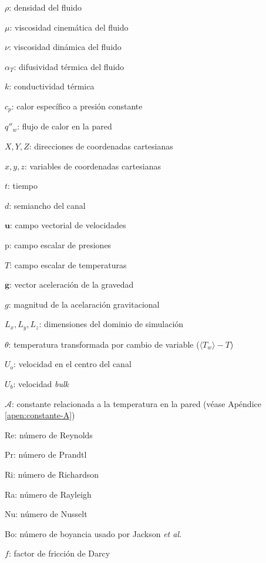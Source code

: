 \documentclass[12pt,screen,twoside]{ibtesis}
\begin{document}
\begin{preliminary}
\begin{abreviaturas}
\begin{itemize}
{{\item[] $\rho$: densidad del fluido 
\item[] $\mu$: viscosidad cinemática del fluido 
\item[] $\nu$: viscosidad dinámica del fluido
\item[] $\alpha_{T}$: difusividad térmica del fluido 
\item[] $k$: conductividad térmica 
\item[] $c_p$: calor específico a presión constante 
\item[] $q''_w$: flujo de calor en la pared 
\item[] $X,Y,Z$: direcciones de coordenadas cartesianas 
\item[] $x,y,z$: variables de coordenadas cartesianas 
\item[] $t$: tiempo 
\item[] $d$: semiancho del canal 
\item[] $\mathbf{u}$: campo vectorial de velocidades 
\item[] $\text{p}$: campo escalar de presiones 
\item[] $T$: campo escalar de temperaturas 
\item[] $\mathbf{g}$: vector aceleración de la gravedad
\item[] $g$: magnitud de la acelaración gravitacional 
\item[] $L_x,L_y,L_z$: dimensiones del dominio de simulación 
\item[] $\theta$: temperatura transformada por cambio de variable ($\langle T_w \rangle - T$)

\item[] $U_o$: velocidad en el centro del canal 
\item[] $U_b$: velocidad \textit{bulk} 
\item[] $\mathcal{A}$: constante relacionada a la temperatura en la pared (véase Apéndice \ref{apen:constante-A}) 

\item[] Re: número de Reynolds
\item[] Pr: número de Prandtl
\item[] Ri: número de Richardson
\item[] Ra: número de Rayleigh
\item[] Nu: número de Nusselt
\item[] Bo: número de boyancia usado por Jackson \textit{et al.} \cite{jackson1989studies}
\item[] $f$: factor de fricción de Darcy


}}
\end{itemize}
\end{abreviaturas}
\end{preliminary}
\end{document}
